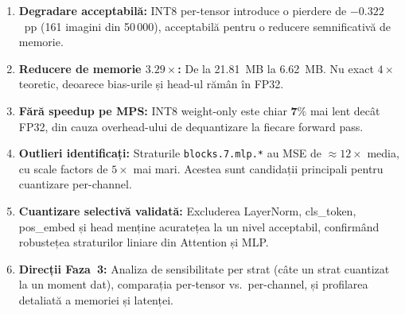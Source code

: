 \documentclass[12pt,a4paper]{article}
\begin{document}
\begin{enumerate}
  \item \textbf{Degradare acceptabilă:} INT8 per-tensor introduce o
    pierdere de $\mathbf{-0.322}$~pp (161 imagini din 50\,000),
    acceptabilă pentru o reducere semnificativă de memorie.

  \item \textbf{Reducere de memorie $\mathbf{3.29\times}$:} De la 21.81~MB
    la 6.62~MB. Nu exact $4\times$ teoretic, deoarece bias-urile și head-ul
    rămân în FP32.

  \item \textbf{Fără speedup pe MPS:} INT8 weight-only este chiar
    $\mathbf{7\%}$ mai lent decât FP32, din cauza overhead-ului de
    dequantizare la fiecare forward pass.

  \item \textbf{Outlieri identificați:} Straturile \texttt{blocks.7.mlp.*}
    au MSE de $\approx 12\times$ media, cu scale factors de $5\times$
    mai mari. Acestea sunt candidații principali pentru cuantizare per-channel.

  \item \textbf{Cuantizare selectivă validată:} Excluderea LayerNorm,
    cls\_token, pos\_embed și head menține acuratețea la un nivel acceptabil,
    confirmând robustețea straturilor liniare din Attention și MLP.

  \item \textbf{Direcții Faza~3:} Analiza de sensibilitate per strat
    (câte un strat cuantizat la un moment dat), comparația per-tensor vs.\
    per-channel, și profilarea detaliată a memoriei și latenței.
\end{enumerate}
\end{document}
